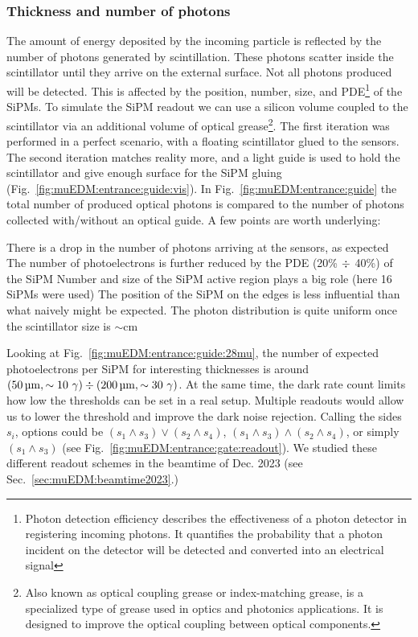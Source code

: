\begin{refsection}
        \subsubsection{Thickness and number of photons}
            The amount of energy deposited by the incoming particle is reflected by the number of photons generated by scintillation.
            These photons scatter inside the scintillator until they arrive on the external surface.
            Not all photons produced will be detected.
            This is affected by the position, number, size, and PDE\footnote{Photon detection efficiency describes the effectiveness of a photon detector in registering incoming photons. It quantifies the probability that a photon incident on the detector will be detected and converted into an electrical signal} of the SiPMs. 
            To simulate the SiPM readout we can use a silicon volume coupled to the scintillator via an additional volume of optical grease\footnote{Also known as optical coupling grease or index-matching grease, is a specialized type of grease used in optics and photonics applications. It is designed to improve the optical coupling between optical components.}.
            The first iteration was performed in a perfect scenario, with a floating scintillator glued to the sensors.
            The second iteration matches reality more, and a light guide is used to hold the scintillator and give enough surface for the SiPM gluing (Fig.~\ref{fig:muEDM:entrance:guide:vis}).
            In Fig.~\ref{fig:muEDM:entrance:guide} the total number of produced optical photons is compared to the number of photons collected with/without an optical guide.
            A few points are worth underlying:
            \begin{outline}
                \1 There is a drop in the number of photons arriving at the sensors, as expected
                \1 The number of photoelectrons is further reduced by the PDE (20\% $\divisionsymbol$ 40\%) of the SiPM
                \1 Number and size of the SiPM active region plays a big role (here 16 SiPMs were used)
                \1 The position of the SiPM on the edges is less influential than what naively might be expected. The photon distribution is quite uniform once the scintillator size is $\sim$cm
            \end{outline}
            Looking at Fig.~\ref{fig:muEDM:entrance:guide:28mu}, the number of expected photoelectrons per SiPM for interesting thicknesses is around $(\SI{50}{\micro\meter}, \sim10\ \gamma)\divisionsymbol(\SI{200}{\micro\meter}, \sim30\ \gamma)$.
            At the same time, the dark rate count limits how low the thresholds can be set in a real setup.
            Multiple readouts would allow us to lower the threshold and improve the dark noise rejection. Calling the sides $s_i$, options could be $(s_1\land s_3)\lor(s_2\land s_4)$, $(s_1\land s_3)\land(s_2\land s_4)$, or simply $(s_1\land s_3)$ (see Fig.~\ref{fig:muEDM:entrance:gate:readout}).
            We studied these different readout schemes in the beamtime of Dec. 2023 (see Sec.~\ref{sec:muEDM:beamtime2023}.)
            

\end{refsection}
